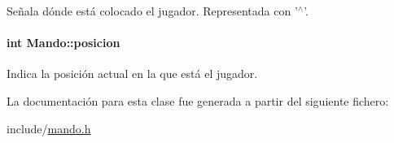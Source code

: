 Señala dónde está colocado el jugador. Representada con '$^\wedge$'. 

\hypertarget{classMando_a7971a6eaa8b936977be7460ffa28530f}{
\paragraph[{posicion}]{\setlength{\rightskip}{0pt plus 5cm}int Mando\-::posicion\hspace{0.3cm}{\ttfamily [private]}}}\label{classMando_a7971a6eaa8b936977be7460ffa28530f}


Indica la posición actual en la que está el jugador. 



La documentación para esta clase fue generada a partir del siguiente fichero\-:\begin{DoxyCompactItemize}
\item 
include/\hyperlink{mando_8h}{mando.\-h}\end{DoxyCompactItemize}

